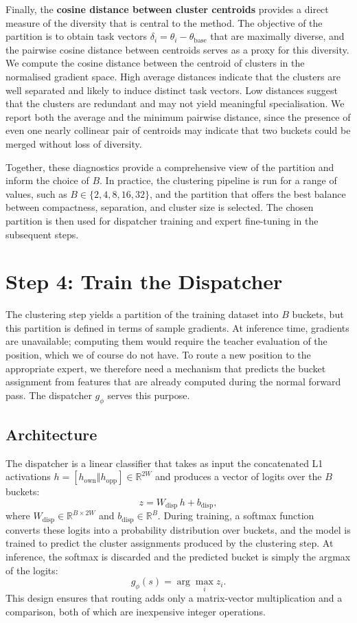 Finally, the \textbf{cosine distance between cluster centroids} provides a direct measure of the diversity that is central to the method. The objective of the partition is to obtain task vectors \(\delta_i = \theta_i - \theta_{\mathrm{base}}\) that are maximally diverse, and the pairwise cosine distance between centroids serves as a proxy for this diversity. We compute the cosine distance between the centroid of clusters in the normalised gradient space. High average distances indicate that the clusters are well separated and likely to induce distinct task vectors. Low distances suggest that the clusters are redundant and may not yield meaningful specialisation. We report both the average and the minimum pairwise distance, since the presence of even one nearly collinear pair of centroids may indicate that two buckets could be merged without loss of diversity.

Together, these diagnostics provide a comprehensive view of the partition and inform the choice of \(B\). In practice, the clustering pipeline is run for a range of values, such as \(B \in \{2, 4, 8, 16, 32\}\), and the partition that offers the best balance between compactness, separation, and cluster size is selected. The chosen partition is then used for dispatcher training and expert fine-tuning in the subsequent steps.

\section{Step 4: Train the Dispatcher}\label{sec:step-dispatcher}

The clustering step yields a partition of the training dataset into \(B\) buckets, but this partition is defined in terms of sample gradients. At inference time, gradients are unavailable; computing them would require the teacher evaluation of the position, which we of course do not have. To route a new position to the appropriate expert, we therefore need a mechanism that predicts the bucket assignment from features that are already computed during the normal forward pass. The dispatcher \(g_\phi\) serves this purpose.

\subsection{Architecture}\label{sec:disp-arch}

The dispatcher is a linear classifier that takes as input the concatenated L1 activations \(h = [h_{\mathrm{own}} \Vert h_{\mathrm{opp}}] \in \mathbb{R}^{2W}\) and produces a vector of logits over the \(B\) buckets:
\[
z = W_{\mathrm{disp}} \, h + b_{\mathrm{disp}},
\]
where \(W_{\mathrm{disp}} \in \mathbb{R}^{B \times 2W}\) and \(b_{\mathrm{disp}} \in \mathbb{R}^{B}\). During training, a softmax function converts these logits into a probability distribution over buckets, and the model is trained to predict the cluster assignments produced by the clustering step. At inference, the softmax is discarded and the predicted bucket is simply the argmax of the logits:
\[
g_\phi(s) = \arg\max_i z_i.
\]
This design ensures that routing adds only a matrix-vector multiplication and a comparison, both of which are inexpensive integer operations.

